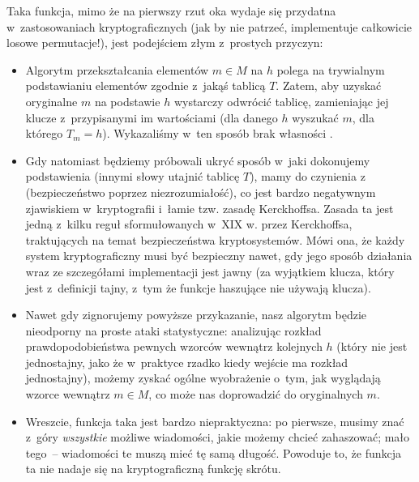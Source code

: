 \documentclass[12pt,a4paper,twoside]{article}
\begin{document}
Taka funkcja, mimo że na pierwszy rzut oka wydaje się przydatna
w~zastosowaniach kryptograficznych (jak by nie patrzeć, implementuje całkowicie
losowe permutacje!), jest podejściem złym z~prostych przyczyn:

\begin{itemize}

    \item Algorytm przekształcania elementów $m \in M$ na $h$ polega na
    trywialnym podstawianiu elementów zgodnie z~jakąś tablicą $T$. Zatem, aby
    uzyskać oryginalne $m$ na podstawie $h$ wystarczy odwrócić tablicę,
    zamieniając jej klucze z~przypisanymi im wartościami (dla danego $h$
    wyszukać $m$, dla którego $T_m = h$). Wykazaliśmy w~ten sposób brak
    własności .

    \item Gdy natomiast będziemy próbowali ukryć sposób w~jaki dokonujemy
    podstawienia (innymi słowy utajnić tablicę $T$), mamy do czynienia
    z~ (bezpieczeństwo poprzez niezrozumiałość),
    co jest bardzo negatywnym zjawiskiem w~kryptografii i~łamie tzw. zasadę
    Kerckhoffsa. Zasada ta jest jedną z~kilku reguł sformułowanych w~XIX w.
    przez Kerckhoffsa, traktujących na temat bezpieczeństwa kryptosystemów.
    Mówi ona, że każdy system kryptograficzny musi być bezpieczny nawet, gdy
    jego sposób działania wraz ze szczegółami implementacji jest jawny (za
    wyjątkiem klucza, który jest z~definicji tajny, z~tym że funkcje haszujące
    nie używają klucza).

    \item Nawet gdy zignorujemy powyższe przykazanie, nasz algorytm będzie
    nieodporny na proste ataki statystyczne: analizując rozkład
    prawdopodobieństwa pewnych wzorców wewnątrz kolejnych $h$ (który nie jest
    jednostajny, jako że w~praktyce rzadko kiedy wejście ma rozkład
    jednostajny), możemy zyskać ogólne wyobrażenie o~tym, jak wyglądają wzorce
    wewnątrz $m \in M$, co może nas doprowadzić do oryginalnych $m$.

    \item Wreszcie, funkcja taka jest bardzo niepraktyczna: po pierwsze, musimy
    znać z~góry \emph{wszystkie} możliwe wiadomości, jakie możemy chcieć
    zahaszować; mało tego~-- wiadomości te muszą mieć tę samą długość. Powoduje
    to, że funkcja ta nie nadaje się na kryptograficzną funkcję skrótu.

\end{itemize}
\end{document}
